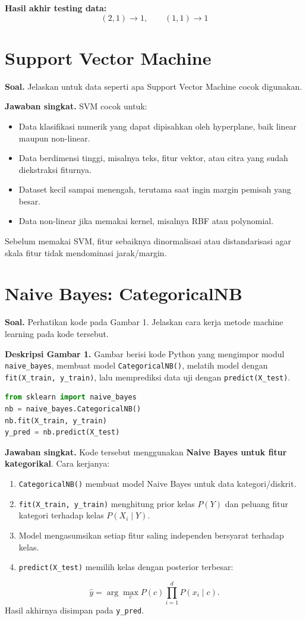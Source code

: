 \documentclass[a4paper,10pt,twocolumn]{article}
\newcommand{\soal}[1]{\textbf{Soal.} #1}
\newcommand{\jawab}{\textbf{Jawaban singkat.} }
\begin{document}
\textbf{Hasil akhir testing data:}
\[
\boxed{(2,1)\rightarrow 1, \qquad (1,1)\rightarrow 1}
\]

\section{Support Vector Machine}

\soal{Jelaskan untuk data seperti apa Support Vector Machine cocok digunakan.}

\jawab
SVM cocok untuk:
\begin{itemize}
    \item Data klasifikasi numerik yang dapat dipisahkan oleh hyperplane, baik linear maupun non-linear.
    \item Data berdimensi tinggi, misalnya teks, fitur vektor, atau citra yang sudah diekstraksi fiturnya.
    \item Dataset kecil sampai menengah, terutama saat ingin margin pemisah yang besar.
    \item Data non-linear jika memakai kernel, misalnya RBF atau polynomial.
\end{itemize}
Sebelum memakai SVM, fitur sebaiknya dinormalisasi atau distandarisasi agar skala fitur tidak mendominasi jarak/margin.

\section{Naive Bayes: CategoricalNB}

\soal{Perhatikan kode pada Gambar 1. Jelaskan cara kerja metode machine learning pada kode tersebut.}

\textbf{Deskripsi Gambar 1.} Gambar berisi kode Python yang mengimpor modul \texttt{naive\_bayes}, membuat model \texttt{CategoricalNB()}, melatih model dengan \texttt{fit(X\_train, y\_train)}, lalu memprediksi data uji dengan \texttt{predict(X\_test)}.

\begin{lstlisting}[language=Python]
from sklearn import naive_bayes
nb = naive_bayes.CategoricalNB()
nb.fit(X_train, y_train)
y_pred = nb.predict(X_test)
\end{lstlisting}

\jawab
Kode tersebut menggunakan \textbf{Naive Bayes untuk fitur kategorikal}. Cara kerjanya:
\begin{enumerate}
    \item \texttt{CategoricalNB()} membuat model Naive Bayes untuk data kategori/diskrit.
    \item \texttt{fit(X\_train, y\_train)} menghitung prior kelas $P(Y)$ dan peluang fitur kategori terhadap kelas $P(X_i \mid Y)$.
    \item Model mengasumsikan setiap fitur saling independen bersyarat terhadap kelas.
    \item \texttt{predict(X\_test)} memilih kelas dengan posterior terbesar:
\end{enumerate}
\[
\hat{y}=\arg\max_c P(c)\prod_{i=1}^{d}P(x_i\mid c).
\]
Hasil akhirnya disimpan pada \texttt{y\_pred}.
\end{document}
